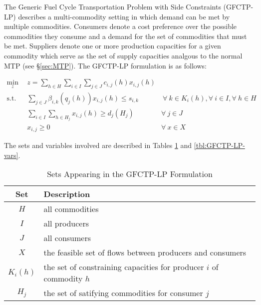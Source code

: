 
The Generic Fuel Cycle Transportation Problem with Side Constraints (GFCTP-LP)
describes a multi-commodity setting in which demand can be met by multiple
commodities. Consumers denote a cost preference over the possible commodities
they consume and a demand for the set of commodities that must be met. Suppliers
denote one or more production capacities for a given commodity which serve as
the set of supply capacities analgous to the normal MTP
(see \S\ref{sec:MTP}). The GFCTP-LP formulation is as follows:

\begin{subequations}\label{eqs:GFCTP-LP}
  \begin{align}
    \min_{z} \:\: & 
    z = \sum_{h \in H}\sum_{i \in I}\sum_{j \in J}c_{i,j}(h) x_{i,j}(h) 
    & \label{eq:GFCTP-LP_obj} \\
    \text{s.t.} \:\: &
    \sum_{j \in J}\beta_{i,k}(q_{j}(h)) x_{i,j}(h) \leq s_{i,k} 
    &
    \: \forall \: k \in K_{i}(h),  
    \forall \: i \in I, \forall \: h \in H \label{eq:GFCTP-LP_sup} \\
    &
    \sum_{i \in I}\sum_{h \in H_{j}} x_{i,j}(h) \geq d_{j}(H_{j}) 
    & 
    \forall \: j \in J \label{eq:GFCTP-LP_dem} \\
    &
    x_{i,j} \geq 0
    &
    \forall \: x \in X \label{eq:GFCTP-LP_x}
  \end{align}
\end{subequations}

The sets and variables involved are described in Tables \ref{tbl:GFCTP-LP-sets}
and \ref{tbl:GFCTP-LP-vars}.

\begin{table} [h!]
\centering
\begin{tabularx}{\textwidth-20pt}{|c|X|} %
\hline
Set         & Description \\
\hline
$H$         & all commodities  \\
$I$         & all producers  \\
$J$         & all consumers  \\
$X$         & the feasible set of flows between producers and consumers  \\
$K_{i}(h)$  & the set of constraining capacities for 
            producer $i$ of commodity $h$  \\
$H_{j}$     & the set of satifying commodities for consumer $j$  \\
\hline
\end{tabularx}
\caption{Sets Appearing in the GFCTP-LP Formulation}
\label{tbl:GFCTP-LP-sets}
\end{table}


